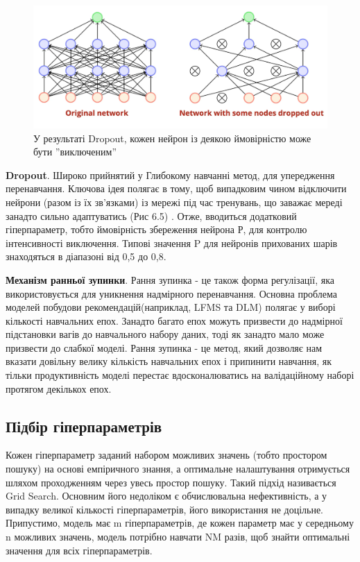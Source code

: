 \begin{figure}
    \centering
    \includegraphics[width=1\textwidth]{images/dropout.png}
    \caption{У результаті Dropout, кожен нейрон із деякою ймовірністю може бути ”виключеним”}
\end{figure}
\textbf{Dropout}. Широко прийнятий у Глибокому навчанні метод, для упередження перенавчання. Ключова ідея полягає в тому, щоб випадковим чином відключити нейрони (разом із їх зв’язками) із мережі під час тренувань, що заважає мереді занадто сильно адаптуватись (Рис 6.5) . Отже, вводиться додатковий гіперпараметр, тобто ймовірність збереження нейрона Р, для контролю інтенсивності виключення. Типові значення P для нейронів прихованих шарів  знаходяться в діапазоні від 0,5 до 0,8.

\textbf{Механізм ранньої зупинки}. Рання зупинка - це також форма регулізації, яка використовується для уникнення надмірного перенавчання. Основна проблема моделей побудови рекомендацій(наприклад, LFMS та DLM) полягає у виборі кількості навчальних епох. Занадто багато епох можуть призвести до надмірної підстановки вагів до навчального набору даних, тоді як занадто мало може призвести до слабкої моделі. Рання зупинка - це метод, який дозволяє нам вказати довільну велику кількість навчальних епох і припинити навчання, як тільки  продуктивність моделі перестає вдосконалюватись на валідаційному наборі протягом декількох епох.
\subsection{Підбір гіперпараметрів}
Кожен гіперпараметр заданий набором можливих значень (тобто простором пошуку) на основі емпіричного знання, а оптимальне налаштування отримується шляхом проходженням через увесь простор пошуку. Такий підхід називається Grid Search. Основним його недоліком є обчислювальна нефективність, а у випадку великої кількості гіперпараметрів, його використання не доцільне. Припустимо, модель має m гіперпараметрів, де кожен параметр має у середньому n можливих значень, модель потрібно навчати NM разів, щоб знайти оптимальні значення для всіх гіперпараметрів.

